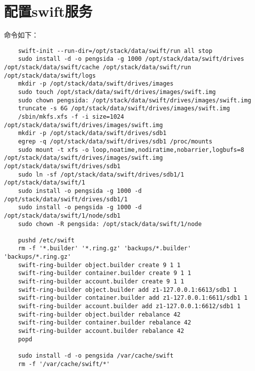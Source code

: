 \documentclass[a4paper,left=1.5cm,right=1.5cm,11pt]{article}
\begin{document}
\section{配置swift服务}
	命令如下：
	\begin{lstlisting}
	swift-init --run-dir=/opt/stack/data/swift/run all stop
	sudo install -d -o pengsida -g 1000 /opt/stack/data/swift/drives /opt/stack/data/swift/cache /opt/stack/data/swift/run /opt/stack/data/swift/logs
	mkdir -p /opt/stack/data/swift/drives/images
	sudo touch /opt/stack/data/swift/drives/images/swift.img
	sudo chown pengsida: /opt/stack/data/swift/drives/images/swift.img
	truncate -s 6G /opt/stack/data/swift/drives/images/swift.img
	/sbin/mkfs.xfs -f -i size=1024 /opt/stack/data/swift/drives/images/swift.img
	mkdir -p /opt/stack/data/swift/drives/sdb1
	egrep -q /opt/stack/data/swift/drives/sdb1 /proc/mounts
	sudo mount -t xfs -o loop,noatime,nodiratime,nobarrier,logbufs=8 /opt/stack/data/swift/drives/images/swift.img /opt/stack/data/swift/drives/sdb1
	sudo ln -sf /opt/stack/data/swift/drives/sdb1/1 /opt/stack/data/swift/1
	sudo install -o pengsida -g 1000 -d /opt/stack/data/swift/drives/sdb1/1
	sudo install -o pengsida -g 1000 -d /opt/stack/data/swift/1/node/sdb1
	sudo chown -R pengsida: /opt/stack/data/swift/1/node

	pushd /etc/swift
	rm -f '*.builder' '*.ring.gz' 'backups/*.builder' 'backups/*.ring.gz'
	swift-ring-builder object.builder create 9 1 1
	swift-ring-builder container.builder create 9 1 1
	swift-ring-builder account.builder create 9 1 1
	swift-ring-builder object.builder add z1-127.0.0.1:6613/sdb1 1
	swift-ring-builder container.builder add z1-127.0.0.1:6611/sdb1 1
	swift-ring-builder account.builder add z1-127.0.0.1:6612/sdb1 1
	swift-ring-builder object.builder rebalance 42
	swift-ring-builder container.builder rebalance 42
	swift-ring-builder account.builder rebalance 42
	popd

	sudo install -d -o pengsida /var/cache/swift
	rm -f '/var/cache/swift/*'
	\end{lstlisting}
\end{document}
